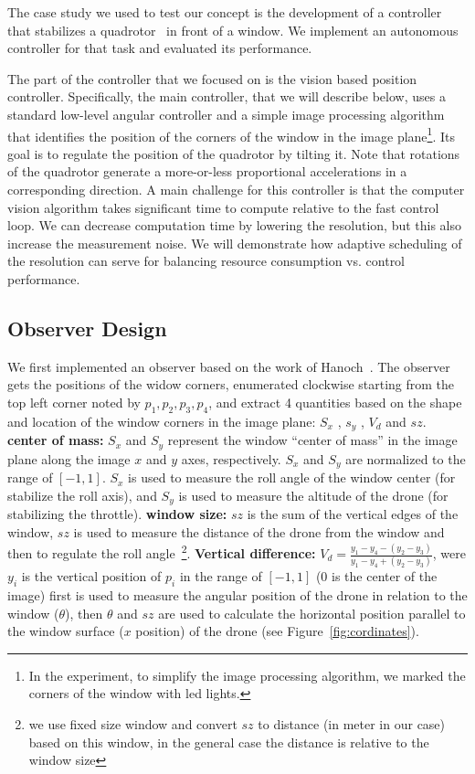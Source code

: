 \documentclass{sig-alternate-ipsn13}
\begin{document}
The case study we used to test our concept is the development of a controller that stabilizes a quadrotor~\cite{?} in front of a window.
We implement an autonomous controller for that task and evaluated its performance.

The part of the controller that we focused on is the vision based position controller. Specifically, the main controller, that we will describe below, uses a standard low-level angular controller and a simple image processing algorithm that identifies the position of the corners of the window in the image plane\footnote{In the experiment, to simplify the image processing algorithm, we marked the corners of the window with led lights.}. Its goal is to regulate the position of the quadrotor by tilting it. Note that rotations of the quadrotor generate a more-or-less proportional accelerations in a corresponding direction. A main challenge for this controller is that the computer vision algorithm takes significant time to compute relative to the fast control loop. We can decrease computation time by lowering the resolution, but this also increase the measurement noise. We will demonstrate how adaptive scheduling of the resolution can serve for balancing resource consumption vs. control performance.

\subsection{Observer Design}
We first implemented an observer based on the work of Hanoch~\cite{Hanoch}. The observer gets the positions of the widow corners, enumerated clockwise starting from the top left corner noted by $p_1,p_2,p_3,p_4$, and extract 4 quantities based on the shape and location of the window corners in the image plane: $S_x$ , $s_y$ , $V_d$ and $sz$.
\textbf{center of mass:} $S_x$ and $S_y$ represent the window ``center of mass'' in the image plane along the image $x$ and $y$ axes, respectively. $S_x$ and $S_y$ are normalized to the range of $[-1,1]$.
$S_x$ is used to measure the roll angle of the window center (for stabilize the roll axis), and $S_y$ is used to measure the altitude of the drone (for stabilizing the throttle).
\textbf{window size:} $sz$ is the sum of the vertical edges of the window, $sz$ is used to measure the distance of the drone from the window and then to regulate the roll angle~\footnote{we use fixed size window and convert $sz$ to distance (in meter in our case) based on this window, in the general case the distance is relative to the window size}.
\textbf{Vertical difference:} $V_d = \frac{y_1-y_4-(y_2-y_3)}{y_1-y_4+(y_2-y_3)}$, were $y_i$ is the vertical position of $p_i$ in the range of $[-1,1]$ (0 is the center of the image) first is used to measure the angular position of the drone in relation to the window ($\theta$), then $\theta$ and $sz$ are used to calculate the horizontal position parallel to the window surface ($x$ position) of the drone (see Figure~\ref{fig:cordinates}). 
\end{document}
